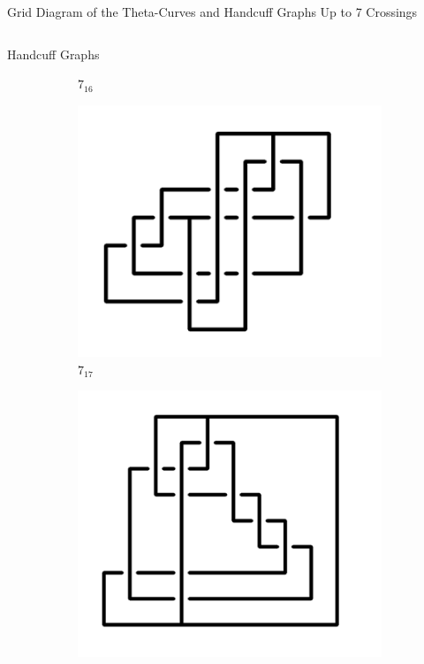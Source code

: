 \documentclass[final]{beamer}
\begin{document}
\begin{frame}[t]
\begin{alertblock}{Grid Diagram of the Theta-Curves and Handcuff Graphs Up to 7 Crossings}
\begin{columns}[t]
\begin{column}{0.5\textwidth}
\begin{alertblock}{Handcuff Graphs}
\begin{figure}
\begin{subfigure}{0.075\textwidth}
    \caption{$7_{16}$} 
    \end{subfigure}
    \begin{subfigure}{0.075\textwidth}
    \includegraphics[width=\columnwidth]{../Midterm_Poster/grid_diagram/handcuff_7_17.png}
    \caption{$7_{17}$} 
    \end{subfigure}
    \begin{subfigure}{0.075\textwidth}
    \includegraphics[width=\columnwidth]{../Midterm_Poster/grid_diagram/handcuff_7_18.png}

\end{subfigure}
\end{figure}
\end{alertblock}
\end{column}
\end{columns}
\end{alertblock}
\end{frame}
\end{document}
